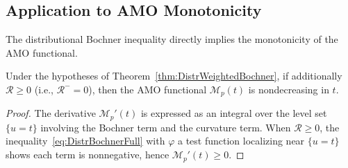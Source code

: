 \subsection{Application to AMO Monotonicity}
The distributional Bochner inequality directly implies the monotonicity of the AMO functional.

\begin{corollary}
Under the hypotheses of Theorem~\ref{thm:DistrWeightedBochner}, if additionally $\mathcal{R} \ge 0$ (i.e., $\mathcal{R}^- = 0$), then the AMO functional $\mathcal{M}_p(t)$ is nondecreasing in $t$.
\end{corollary}

\begin{proof}
The derivative $\mathcal{M}_p'(t)$ is expressed as an integral over the level set $\{u = t\}$ involving the Bochner term and the curvature term. When $\mathcal{R} \ge 0$, the inequality~\eqref{eq:DistrBochnerFull} with $\varphi$ a test function localizing near $\{u = t\}$ shows each term is nonnegative, hence $\mathcal{M}_p'(t) \ge 0$.
\end{proof}
